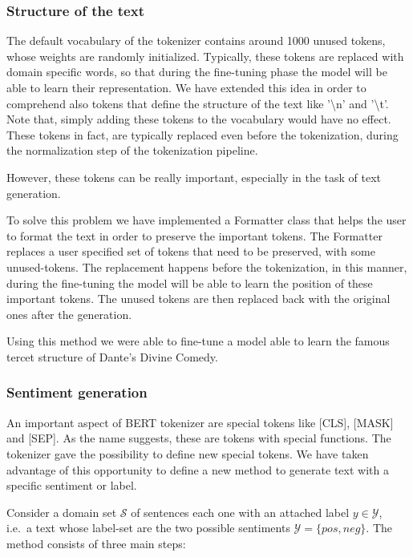 \documentclass[10pt,twocolumn,letterpaper]{article}
\begin{document}
\subsubsection{Structure of the text}
\label{section:structureText}
The default vocabulary of the tokenizer contains around 1000 unused tokens, whose weights are randomly initialized.
Typically, these tokens are replaced with domain specific words, so that during the fine-tuning phase
the model will be able to learn their representation.
We have extended this idea in order to comprehend also tokens that define the structure of the text like
'\textbackslash n' and '\textbackslash t'.
Note that, simply adding these tokens to the vocabulary would have no effect.
These tokens in fact, are typically replaced even before the tokenization, during the normalization step of the tokenization pipeline.

However, these tokens can be really important, especially in the task of text generation.

To solve this problem we have implemented a Formatter class that helps the user to format the text in order
to preserve the important tokens.
The Formatter replaces a user specified set of tokens that need to be preserved, with some unused-tokens.
The replacement happens before the tokenization, in this manner, during the fine-tuning the model will be able to learn
the position of these important tokens.
The unused tokens are then replaced back with the original ones after the generation.

Using this method we were able to fine-tune a model able to learn the famous tercet structure of Dante's Divine Comedy.

\subsubsection{Sentiment generation}
\label{sentiment}
An important aspect of BERT tokenizer are special tokens like [CLS], [MASK] and [SEP].
As the name suggests, these are tokens with special functions.
The tokenizer gave the possibility to define new special tokens.
We have taken advantage of this opportunity to define a new method to generate text with a specific sentiment or label.

Consider a domain set $\mathcal S$ of sentences each one with an attached label $y\in \mathcal Y$,
i.e.\ a text whose label-set are the two possible sentiments $\mathcal Y =\{pos, neg\}$.
The method consists of three main steps:
\end{document}
